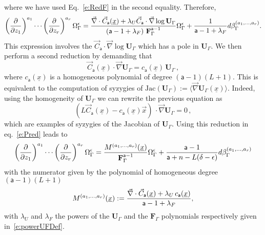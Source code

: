\documentclass[a4paper,12pt]{article}
\numberwithin{equation}{section}
\numberwithin{figure}{section}
\begin{document}
where we have used Eq.~\eqref{e:RedF} in the second equality. Therefore, 
\begin{equation}
	\label{e:Pred}
\left(\partial\over \partial z_1\right)^{a_1}\cdots\left(\partial
  \over\partial z_r\right)^{a_r} \Omega_\Gamma^\epsilon={
\vec\nabla \cdot \vec C_{\mathsf{a}}
     (\underline x)
+ \lambda_U \vec
    C_{\mathsf{a}}\cdot\vec\nabla\log\mathbf{U}_\Gamma\over \left(\mathsf{a}-1+\lambda_F\right)\,\textbf{F}_\Gamma^{\mathsf{a}-1}}
  \Omega_\Gamma^\epsilon
+{  1\over \mathsf{a}-1+\lambda_F} d\beta_\Gamma^{(a_1,\dots,a_r)}.
\end{equation}
%
This expression involves the $\vec
    C_{\mathsf{a}}\cdot\vec\nabla\log\mathbf{U}_\Gamma$ which has a
    pole in $\mathbf{U}_\Gamma$. We then perform a second reduction by demanding that
    \begin{equation}
      \label{e:RedU}
      \vec
    C_{\mathsf{a}}(\underline x)\cdot\vec\nabla \mathbf{U}_\Gamma =
    c_{\mathsf{a}}(\underline x) \, \mathbf{U}_\Gamma \, ,
    \end{equation}
where $ c_{\mathsf{a}}(\underline x)$ is a homogeneous polynomial of
degree $(\mathsf{a}-1)(L+1)$. This is equivalent to the computation of
syzygies of $\text{Jac}( \mathbf
U_\Gamma):=\langle \vec\nabla \textbf{U}_\Gamma(\underline x)\rangle$. Indeed,  using the homogeneity of $\mathbf{U}_\Gamma$ we can rewrite the previous equation as 
\begin{equation}
 \left( L   \vec
C_{\mathsf{a}}(\underline x) -
c_{\mathsf{a}}(\underline x) \vec{x} \right) \, \cdot\vec\nabla
\mathbf{U}_\Gamma =0\, ,
\end{equation}
which are examples of syzygies of the Jacobian of $\mathbf U_\Gamma$. Using this reduction in eq.~\eqref{e:Pred} leads to
% 
\begin{equation}\label{e:RedFinal}
\left(\partial\over \partial z_1\right)^{a_1}\cdots\left(\partial
  \over\partial z_r\right)^{a_r} \Omega_\Gamma^\epsilon={
M^{(a_1,\dots,a_r)}
     (\underline x)
\over \textbf{F}_\Gamma^{\mathsf{a}-1}}\Omega_\Gamma^\epsilon
+{  \mathsf{a}-1\over \mathsf{a}+n-L(\delta-\epsilon)} d\beta_\Gamma^{(a_1,\dots,a_r)}
\end{equation}
with the numerator given by the polynomial of homogeneous degree $(\mathsf{a}-1)(L+1)$
\begin{equation}
  \label{e:Mdimregfinal}
  M^{(a_1,\dots,a_r)}(\underline x):={\vec\nabla \cdot \vec C_{\mathsf{a}}
     (\underline x)
+ \lambda_U\, 
    c_{\mathsf{a}}(\underline x)\over \mathsf{a}-1+\lambda_F },
\end{equation}
with $\lambda_U$ and $\lambda_F$ the powers of the $\textbf{U}_\Gamma$
and the $\textbf{F}_\Gamma$ polynomials respectively given in~\eqref{e:powerUFDef}.
%
\end{document}

